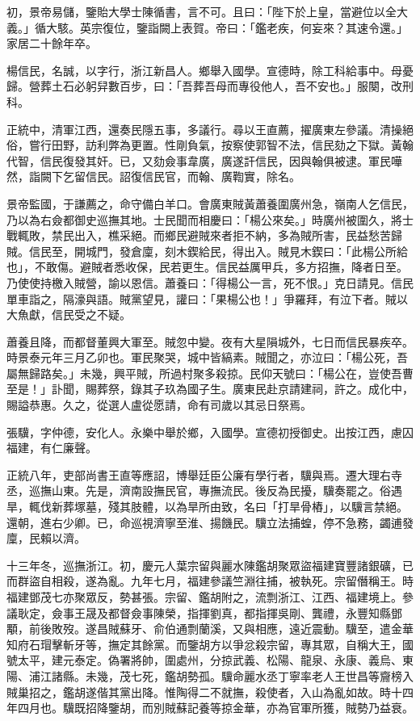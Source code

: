 \begin{pinyinscope}
初，景帝易儲，鑒貽大學士陳循書，言不可。且曰：「陛下於上皇，當避位以全大義。」循大駭。英宗復位，鑒詣闕上表賀。帝曰：「鑑老疾，何妄來？其速令還。」家居二十餘年卒。

楊信民，名誠，以字行，浙江新昌人。鄉舉入國學。宣德時，除工科給事中。母憂歸。營葬土石必躬舁數百步，曰：「吾葬吾母而專役他人，吾不安也。」服闋，改刑科。

正統中，清軍江西，還奏民隱五事，多議行。尋以王直薦，擢廣東左參議。清操絕俗，嘗行田野，訪利弊為更置。性剛負氣，按察使郭智不法，信民劾之下獄。黃翰代智，信民復發其奸。已，又劾僉事韋廣，廣遂訐信民，因與翰俱被逮。軍民嘩然，詣闕下乞留信民。詔復信民官，而翰、廣鞫實，除名。

景帝監國，于謙薦之，命守備白羊口。會廣東賊黃蕭養圍廣州急，嶺南人乞信民，乃以為右僉都御史巡撫其地。士民聞而相慶曰：「楊公來矣。」時廣州被圍久，將士戰輒敗，禁民出入，樵采絕。而鄉民避賊來者拒不納，多為賊所害，民益愁苦歸賊。信民至，開城門，發倉廩，刻木鍥給民，得出入。賊見木鍥曰：「此楊公所給也」，不敢傷。避賊者悉收保，民若更生。信民益厲甲兵，多方招撫，降者日至。乃使使持檄入賊營，諭以恩信。蕭養曰：「得楊公一言，死不恨。」克日請見。信民單車詣之，隔濠與語。賊黨望見，讙曰：「果楊公也！」爭羅拜，有泣下者。賊以大魚獻，信民受之不疑。

蕭養且降，而都督董興大軍至。賊忽中變。夜有大星隕城外，七日而信民暴疾卒。時景泰元年三月乙卯也。軍民聚哭，城中皆縞素。賊聞之，亦泣曰：「楊公死，吾屬無歸路矣。」未幾，興平賊，所過村聚多殺掠。民仰天號曰：「楊公在，豈使吾曹至是！」訃聞，賜葬祭，錄其子玖為國子生。廣東民赴京請建祠，許之。成化中，賜謚恭惠。久之，從選人盧從愿請，命有司歲以其忌日祭焉。

張驥，字仲德，安化人。永樂中舉於鄉，入國學。宣德初授御史。出按江西，慮囚福建，有仁廉聲。

正統八年，吏部尚書王直等應詔，博舉廷臣公廉有學行者，驥與焉。遷大理右寺丞，巡撫山東。先是，濟南設撫民官，專撫流民。後反為民擾，驥奏罷之。俗遇旱，輒伐新葬塚墓，殘其肢體，以為旱所由致，名曰「打旱骨樁」，以驥言禁絕。還朝，進右少卿。已，命巡視濟寧至淮、揚饑民。驥立法捕蝗，停不急務，蠲逋發廩，民賴以濟。

十三年冬，巡撫浙江。初，慶元人葉宗留與麗水陳鑑胡聚眾盜福建寶豐諸銀礦，已而群盜自相殺，遂為亂。九年七月，福建參議竺淵往捕，被執死。宗留僭稱王。時福建鄧茂七亦聚眾反，勢甚張。宗留、鑑胡附之，流剽浙江、江西、福建境上。參議耿定，僉事王晟及都督僉事陳榮，指揮劉真，都指揮吳剛、龔禮，永豐知縣鄧顒，前後敗歿。遂昌賊蘇牙、俞伯通剽蘭溪，又與相應，遠近震動。驥至，遣金華知府石瑁擊斬牙等，撫定其餘黨。而鑒胡方以爭忿殺宗留，專其眾，自稱大王，國號太平，建元泰定。偽署將帥，圍處州，分掠武義、松陽、龍泉、永康、義烏、東陽、浦江諸縣。未幾，茂七死，鑑胡勢孤。驥命麗水丞丁寧率老人王世昌等齎榜入賊巢招之，鑑胡遂偕其黨出降。惟陶得二不就撫，殺使者，入山為亂如故。時十四年四月也。驥既招降鑒胡，而別賊蘇記養等掠金華，亦為官軍所獲，賊勢乃益衰。


\end{pinyinscope}
